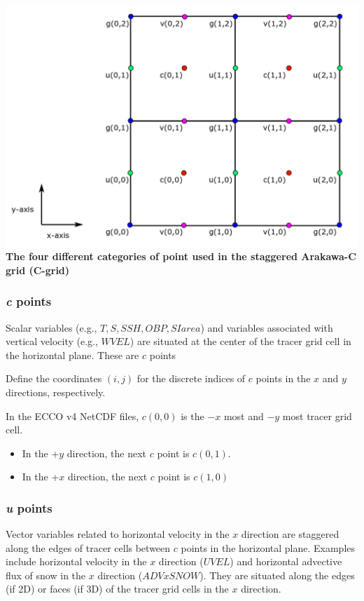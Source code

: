 \documentclass[11pt]{article}
\makeatletter
\def\maxwidth{\ifdim\Gin@nat@width>\linewidth\linewidth
    \else\Gin@nat@width\fi}
\let\Oldincludegraphics\includegraphics
\renewcommand{\includegraphics}[1]{\Oldincludegraphics[width=.8\maxwidth]{#1}}
\providecommand{\tightlist}{%
      \setlength{\itemsep}{0pt}\setlength{\parskip}{0pt}}
\makeatother
\begin{document}
\includegraphics{../figures/C-grid-points.png} \textbf{The four
different categories of point used in the staggered Arakawa-C grid
(C-grid)}

\subsubsection{\texorpdfstring{\emph{c}
points}{c points}}\label{c-points}

Scalar variables (e.g., \(T, S, SSH, OBP, SIarea\)) and variables
associated with vertical velocity (e.g., \(WVEL\)) are situated at the
center of the tracer grid cell in the horizontal plane. These are \(c\)
points

Define the coordinates \((i,j)\) for the discrete indices of \(c\)
points in the \(x\) and \(y\) directions, respectively.

In the ECCO v4 NetCDF files, \(c(0,0)\) is the \(-x\) most and \(-y\)
most tracer grid cell.

\begin{itemize}
\tightlist
\item
  In the +\(y\) direction, the next \(c\) point is \(c(0,1)\).
\item
  In the +\(x\) direction, the next \(c\) point is \(c(1,0)\)
\end{itemize}

\subsubsection{\texorpdfstring{\emph{u}
points}{u points}}\label{u-points}

Vector variables related to horizontal velocity in the \(x\) direction
are staggered along the edges of tracer cells between \(c\) points in
the horizontal plane. Examples include horizontal velocity in the \(x\)
direction (\(UVEL\)) and horizontal advective flux of snow in the \(x\)
direction (\(ADVxSNOW\)). They are situated along the edges (if 2D) or
faces (if 3D) of the tracer grid cells in the \(x\) direction.
\end{document}
